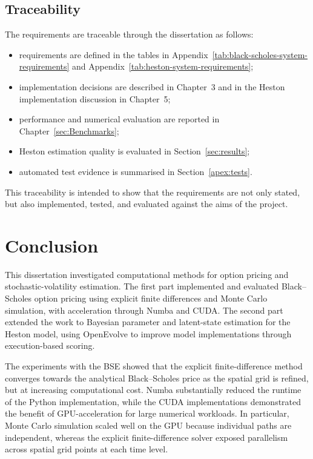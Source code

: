 \documentclass[11pt]{report}
\begin{document}
\section{Traceability}
The requirements are traceable through the dissertation as follows:
\begin{itemize}
    \item requirements are defined in the tables in Appendix~\ref{tab:black-scholes-system-requirements} and Appendix~\ref{tab:heston-system-requirements};
    \item implementation decisions are described in Chapter~3 and in the Heston implementation discussion in Chapter~5;
    \item performance and numerical evaluation are reported in Chapter~\ref{sec:Benchmarks};
    \item Heston estimation quality is evaluated in Section~\ref{sec:results};
    \item automated test evidence is summarised in Section~\ref{apex:tests}.
\end{itemize}

This traceability is intended to show that the requirements are not only
stated, but also implemented, tested, and evaluated against the aims of the
project.

\chapter{Conclusion}
This dissertation investigated computational methods for option pricing and stochastic-volatility estimation. The first part implemented and
evaluated Black--Scholes option pricing using explicit finite differences and Monte Carlo simulation, with acceleration through Numba and CUDA.
The second part extended the work to Bayesian parameter and latent-state estimation for the Heston model, using OpenEvolve to improve model
implementations through execution-based scoring.

The experiments with the BSE showed that the explicit 
finite-difference method converges towards the analytical 
Black--Scholes price as the
spatial grid is refined, but at increasing computational 
cost. Numba substantially reduced the runtime of 
the Python implementation, while the
CUDA implementations demonstrated the benefit of 
GPU-acceleration for large numerical workloads. 
In particular, Monte Carlo simulation scaled
well on the GPU because individual paths are 
independent, whereas the explicit finite-difference 
solver exposed parallelism across spatial grid
points at each time level.
\end{document}
